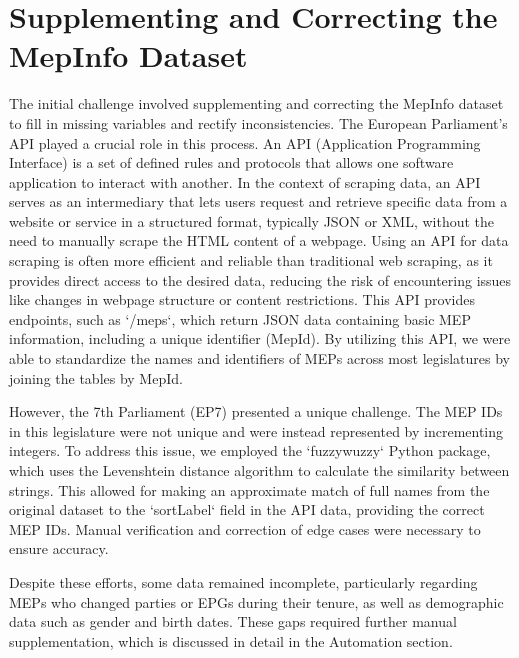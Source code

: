 \documentclass[a4paper,12pt]{report}
\begin{document}
        \section{Supplementing and Correcting the MepInfo Dataset}
            \label{sec:supplementing-and-correcting-the-mepinfo-dataset}


            The initial challenge involved supplementing and correcting the MepInfo dataset to fill in missing variables
            and
            rectify inconsistencies.
            The European Parliament's API played a crucial role in this process. An API
            (Application
            Programming Interface) is a set of defined rules and protocols that allows one software application to
            interact with
            another.
            In the context of scraping data, an API serves as an intermediary that lets users request and
            retrieve
            specific data from a website or service in a structured format, typically JSON or XML, without the need to
            manually
            scrape the HTML content of a webpage.
            Using an API for data scraping is often more efficient and reliable than traditional web scraping, as it
            provides
            direct access to the desired data, reducing the risk of encountering issues like changes in webpage
            structure or
            content restrictions.
            This API provides endpoints, such as `/meps`, which return JSON data containing basic
            MEP
            information, including a unique identifier (MepId).
            By utilizing this API, we were able to standardize the
            names and
            identifiers of MEPs across most legislatures by joining the tables by MepId.

            However, the 7th Parliament (EP7) presented a unique challenge.
            The MEP IDs in this legislature were not
            unique and
            were instead represented by incrementing integers.
            To address this issue, we employed the `fuzzywuzzy`
            Python
            package, which uses the Levenshtein distance algorithm to calculate the similarity between strings. This
            allowed for
            making an approximate match of full names from the original dataset to the `sortLabel` field in the API
            data,
            providing the correct MEP IDs. Manual verification and correction of edge cases were necessary to ensure
            accuracy.

            Despite these efforts, some data remained incomplete, particularly regarding MEPs who changed parties or
            EPGs during
            their tenure, as well as demographic data such as gender and birth dates. These gaps required further manual
            supplementation, which is discussed in detail in the Automation section.
\end{document}
